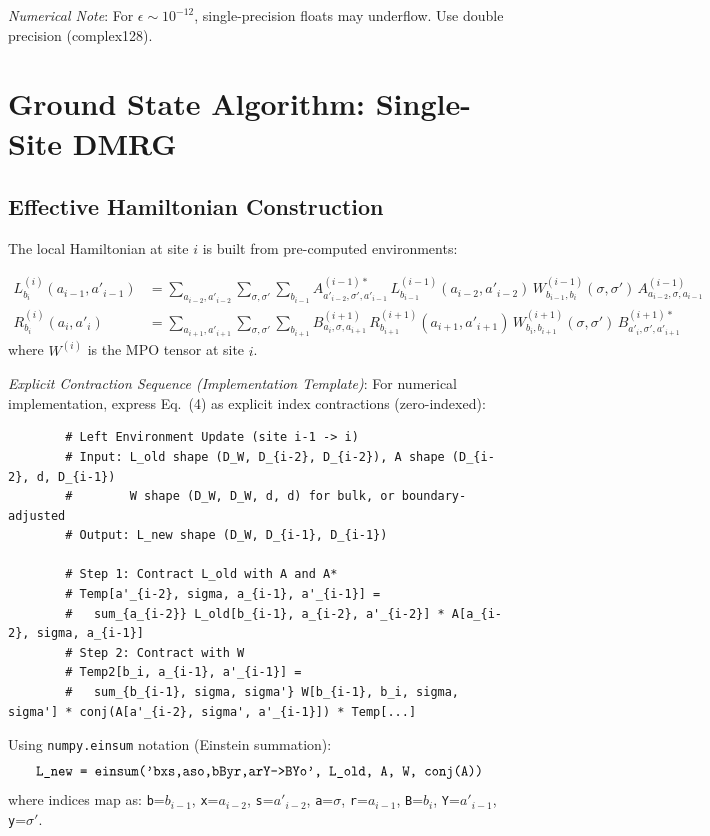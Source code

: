 \documentclass[aps,prb,onecolumn,scriptaddress]{revtex4-2}
\newcommand{\eps}{\epsilon}
\begin{document}
	\textit{Numerical Note}: For $\eps \sim 10^{-12}$, single-precision floats may underflow. Use double precision (complex128).
	
	\section{Ground State Algorithm: Single-Site DMRG}
	
	\subsection{Effective Hamiltonian Construction}
	The local Hamiltonian at site $i$ is built from pre-computed environments:
	
	\begin{align}
		L^{(i)}_{b_i}(a_{i-1}, a'_{i-1}) &= \sum_{a_{i-2}, a'_{i-2}} \sum_{\sigma, \sigma'} \sum_{b_{i-1}} A^{(i-1)*}_{a'_{i-2},\sigma',a'_{i-1}} \, L^{(i-1)}_{b_{i-1}}(a_{i-2}, a'_{i-2}) \, W^{(i-1)}_{b_{i-1},b_i}(\sigma, \sigma') \, A^{(i-1)}_{a_{i-2},\sigma,a_{i-1}} \\
		R^{(i)}_{b_i}(a_i, a'_i) &= \sum_{a_{i+1}, a'_{i+1}} \sum_{\sigma, \sigma'} \sum_{b_{i+1}} B^{(i+1)}_{a_i,\sigma,a_{i+1}} \, R^{(i+1)}_{b_{i+1}}(a_{i+1}, a'_{i+1}) \, W^{(i+1)}_{b_i,b_{i+1}}(\sigma, \sigma') \, B^{(i+1)*}_{a'_i,\sigma',a'_{i+1}}
	\end{align}	
	where $W^{(i)}$ is the MPO tensor at site $i$.
	
	\textit{Explicit Contraction Sequence (Implementation Template)}:
	For numerical implementation, express Eq.~(4) as explicit index contractions (zero-indexed):
	\begin{verbatim}
		# Left Environment Update (site i-1 -> i)
		# Input: L_old shape (D_W, D_{i-2}, D_{i-2}), A shape (D_{i-2}, d, D_{i-1})
		#        W shape (D_W, D_W, d, d) for bulk, or boundary-adjusted
		# Output: L_new shape (D_W, D_{i-1}, D_{i-1})
		
		# Step 1: Contract L_old with A and A*
		# Temp[a'_{i-2}, sigma, a_{i-1}, a'_{i-1}] = 
		#   sum_{a_{i-2}} L_old[b_{i-1}, a_{i-2}, a'_{i-2}] * A[a_{i-2}, sigma, a_{i-1}]
		# Step 2: Contract with W
		# Temp2[b_i, a_{i-1}, a'_{i-1}] = 
		#   sum_{b_{i-1}, sigma, sigma'} W[b_{i-1}, b_i, sigma, sigma'] * conj(A[a'_{i-2}, sigma', a'_{i-1}]) * Temp[...]
	\end{verbatim}
	Using \texttt{numpy.einsum} notation (Einstein summation):
	\begin{equation}
		\text{\texttt{L\_new = einsum('bxs,aso,bByr,arY->BYo', L\_old, A, W, conj(A))}}
	\end{equation}
	where indices map as: \texttt{b}=$b_{i-1}$, \texttt{x}=$a_{i-2}$, \texttt{s}=$a'_{i-2}$, \texttt{a}=$\sigma$, \texttt{r}=$a_{i-1}$, \texttt{B}=$b_i$, \texttt{Y}=$a'_{i-1}$, \texttt{y}=$\sigma'$.
	
\end{document}
